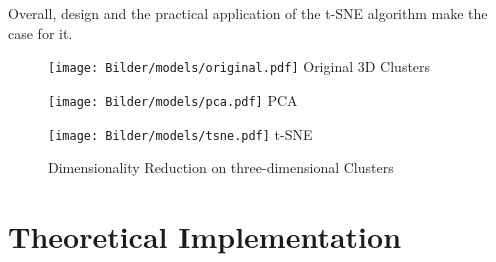 Overall, design and the practical application of the \ac{t-SNE} algorithm make the case for it.




\begin{figure} 
	\begin{minipage}{0.3\textwidth}
		
		\texttt{[image: Bilder/models/original.pdf]}
			\label{fig:original}
		\captionsetup{labelformat=empty}
		\centering
		Original 3D Clusters
	
	\end{minipage}
	\hfill
	\begin{minipage}{0.3\textwidth}
		
		\texttt{[image: Bilder/models/pca.pdf]}
		\label{fig:pca}
		\captionsetup{labelformat=empty}
		\centering
		\ac{PCA}
	\end{minipage}
	\hfill
	\begin{minipage}{0.3\textwidth}
		
		\texttt{[image: Bilder/models/tsne.pdf]}
		\label{fig:tsne}
		\captionsetup{labelformat=empty}
		\centering
		\ac{t-SNE}
	\end{minipage}
	
\caption{Dimensionality Reduction on three-dimensional Clusters}
\label{fig:DR}
\end{figure} 

\section{Theoretical Implementation}

